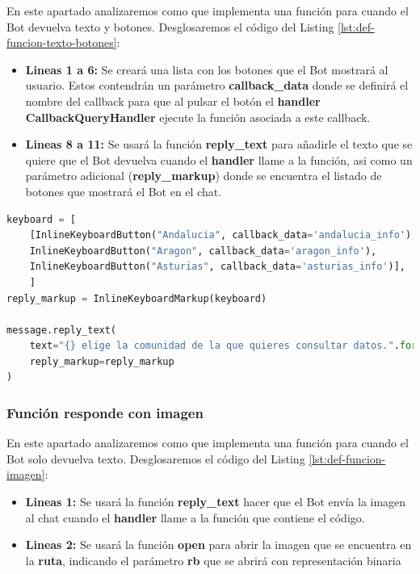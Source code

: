 En este apartado analizaremos como que implementa una función para cuando el Bot devuelva texto y botones. Desglosaremos el código del Listing \ref{lst:def-funcion-texto-botones}:

\begin{itemize}
	\item \textbf{Lineas 1 a 6:} Se creará una lista con los botones que el Bot mostrará al usuario. Estos contendrán un parámetro \textbf{callback\_data} donde se definirá el nombre del callback para que al pulsar el botón el \textbf{handler CallbackQueryHandler} ejecute la función asociada a este callback.
	\item \textbf{Lineas 8 a 11:} Se usará la función \textbf{reply\_text} para añadirle el texto que se quiere que el Bot devuelva cuando el \textbf{handler} llame a la función, asi como un parámetro adicional (\textbf{reply\_markup}) donde se encuentra el listado de botones que mostrará el Bot en el chat.
\end{itemize}

\begin{lstlisting}[language=Python, caption={Función que devuelve texto y botones en el chat.}, label={lst:def-funcion-texto-botones}]
keyboard = [
	[InlineKeyboardButton("Andalucia", callback_data='andalucia_info'),
	InlineKeyboardButton("Aragon", callback_data='aragon_info'),
	InlineKeyboardButton("Asturias", callback_data='asturias_info')],
	]
reply_markup = InlineKeyboardMarkup(keyboard)

message.reply_text(
	text="{} elige la comunidad de la que quieres consultar datos.".format(username),
	reply_markup=reply_markup
)
\end{lstlisting}

\subsubsection{Función responde con imagen}

En este apartado analizaremos como que implementa una función para cuando el Bot solo devuelva texto. Desglosaremos el código del Listing \ref{lst:def-funcion-imagen}:

\begin{itemize}
	\item \textbf{Lineas 1:} Se usará la función \textbf{reply\_text} hacer que el Bot envía la imagen al chat cuando el \textbf{handler} llame a la función que contiene el código.
	\item \textbf{Lineas 2:} Se usará la función \textbf{open} para abrir la imagen que se encuentra en la \textbf{ruta}, indicando el parámetro \textbf{rb} que se abrirá con representación binaria
\end{itemize}


